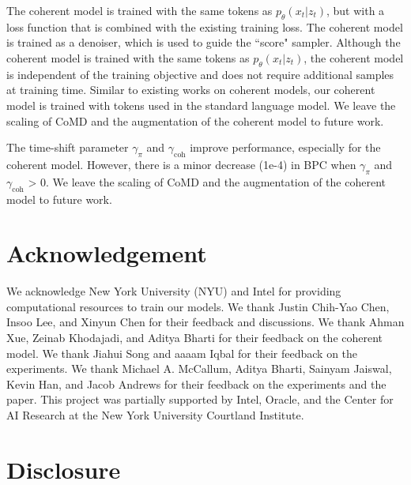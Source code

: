 The coherent model is trained with the same tokens as $p_\theta(x_t|z_t)$, but with a loss function that is combined with the existing training loss. The coherent model is trained as a denoiser, which is used to guide the ``score" sampler. Although the coherent model is trained with the same tokens as $p_\theta(x_t|z_t)$, the coherent model is independent of the training objective and does not require additional samples at training time. Similar to existing works on coherent models, our coherent model is trained with tokens used in the standard language model. We leave the scaling of CoMD and the augmentation of the coherent model to future work. 

The time-shift parameter $\gamma_\pi$ and $\gamma_\mathrm{coh}$ improve performance, especially for the coherent model. However, there is a minor decrease (1e-4) in BPC when $\gamma_\pi$ and $\gamma_\mathrm{coh}$ > 0. We leave the scaling of CoMD and the augmentation of the coherent model to future work. 



\section{Acknowledgement}

We acknowledge New York University (NYU) and Intel for providing computational resources to train our models. We thank Justin Chih-Yao Chen, Insoo Lee, and Xinyun Chen for their feedback and discussions. We thank Ahman Xue, Zeinab Khodajadi, and Aditya Bharti for their feedback on the coherent model. We thank Jiahui Song and aaaam Iqbal for their feedback on the experiments. We thank Michael A. McCallum, Aditya Bharti, Sainyam Jaiswal, Kevin Han, and Jacob Andrews for their feedback on the experiments and the paper. This project was partially supported by Intel, Oracle, and the Center for AI Research at the New York University Courtland Institute. 







\section{Disclosure}
